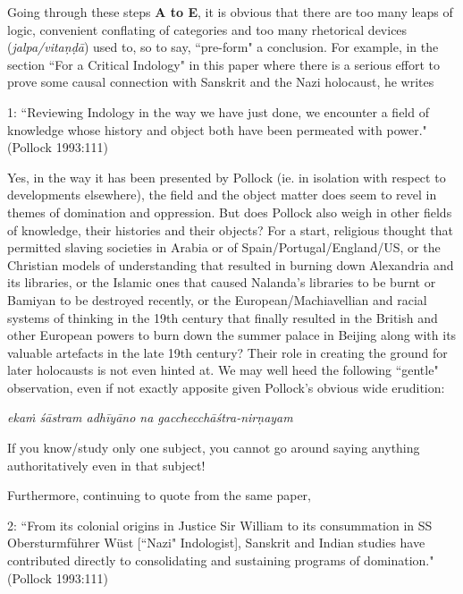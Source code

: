 {\begin{enumerate}
Going through these steps {\bf A to E}, it is obvious that there are too many leaps of logic, convenient conflating of categories and too many rhetorical devices ({\sl jalpa/vitaṇḍā}) used to, so to say, “pre-form" a conclusion. For example, in the section ``For a Critical Indology" in this paper where there is a serious effort to prove some causal connection with Sanskrit and the Nazi holocaust, he writes
\begin{myquote}
1: ``Reviewing Indology in the way we have just done, we encounter a field of knowledge whose history and object 
both have been permeated with power."\hfill (Pollock 1993:111)
\end{myquote}

Yes, in the way it has been presented by Pollock (ie. in isolation with respect to developments elsewhere), the field and the object matter does seem to revel in themes of domination and oppression. But does Pollock also weigh in other fields of knowledge, their histories and their objects? For a start, religious thought that permitted slaving societies in Arabia or of Spain/Portugal/England/US, or the Christian models of understanding that resulted in burning down Alexandria and its libraries, or the Islamic ones that caused Nalanda's libraries to be burnt or Bamiyan to be destroyed recently, or the European/Machiavellian and racial systems of thinking in the 19th century that finally resulted in the British and other European powers to burn down the summer palace in Beijing along with its valuable artefacts in the late 19th century?  Their role in creating the ground for later holocausts is not even hinted at. We may well heed the following ``gentle" observation, even if not exactly apposite given Pollock’s obvious wide erudition:
\begin{myquote}
{\sl ekaṁ śāstram adhīyāno na gacchecchāśtra-nirṇayam}
\end{myquote}
If you know/study only one subject, you cannot go around saying anything authoritatively even in that subject!

Furthermore, continuing to quote from the same paper,
\begin{myquote}
2: ``From its colonial origins in Justice Sir William to its consummation in SS Obersturmführer Wüst [``Nazi" Indologist], Sanskrit and Indian studies have contributed directly to consolidating and sustaining programs of domination."	\hfill(Pollock 1993:111)
\end{myquote}


\end{enumerate}}

